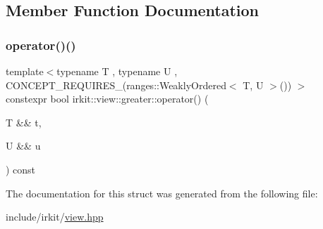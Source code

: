 \subsection{Member Function Documentation}
\mbox{\label{structirkit_1_1view_1_1greater_af6f67e2c5f9976b8e6a4ff3ddc9fbd1d}} 
\subsubsection{\texorpdfstring{operator()()}{operator()()}}
{\footnotesize\ttfamily template$<$typename T , typename U , C\+O\+N\+C\+E\+P\+T\+\_\+\+R\+E\+Q\+U\+I\+R\+E\+S\+\_\+(ranges\+::\+Weakly\+Ordered$<$ T, U $>$()) $>$ \\
constexpr bool irkit\+::view\+::greater\+::operator() (\begin{DoxyParamCaption}\item[{T \&\&}]{t,  }\item[{U \&\&}]{u }\end{DoxyParamCaption}) const\hspace{0.3cm}{\ttfamily [inline]}}



The documentation for this struct was generated from the following file\+:\begin{DoxyCompactItemize}
\item 
include/irkit/\hyperlink{view_8hpp}{view.\+hpp}\end{DoxyCompactItemize}
